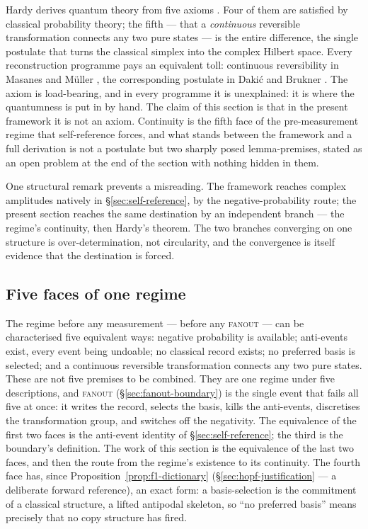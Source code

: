Hardy derives quantum theory from five axioms \autocite{Hardy2001a}. Four of them are satisfied by
classical probability theory; the fifth --- that a \emph{continuous} reversible transformation
connects any two pure states --- is the entire difference, the single postulate that turns the
classical simplex into the complex Hilbert space. Every reconstruction programme pays an equivalent
toll: continuous reversibility in Masanes and M\"{u}ller \autocite{muller_p_2011}, the corresponding
postulate in Daki\'{c} and Brukner \autocite{Brukner2009}. The axiom is load-bearing, and in every
programme it is unexplained: it is where the quantumness is put in by hand. The claim of this
section is that in the present framework it is not an axiom. Continuity is the fifth face of the
pre-measurement regime that self-reference forces, and what stands between the framework and a full
derivation is not a postulate but two sharply posed lemma-premises, stated as an open problem at the
end of the section with nothing hidden in them.

One structural remark prevents a misreading. The framework reaches complex amplitudes natively in
\S\ref{sec:self-reference}, by the negative-probability route; the present section reaches the same
destination by an independent branch --- the regime's continuity, then Hardy's theorem. The two
branches converging on one structure is over-determination, not circularity, and the convergence is
itself evidence that the destination is forced.

\subsection{Five faces of one regime}

The regime before any measurement --- before any \textsc{fanout} --- can be characterised five
equivalent ways: negative probability is available; anti-events exist, every event being undoable;
no classical record exists; no preferred basis is selected; and a continuous reversible
transformation connects any two pure states. These are not five premises to be combined. They are
one regime under five descriptions, and \textsc{fanout} (\S\ref{sec:fanout-boundary}) is the single
event that fails all five at once: it writes the record, selects the basis, kills the anti-events,
discretises the transformation group, and switches off the negativity. The equivalence of the first
two faces is the anti-event identity of \S\ref{sec:self-reference}; the third is the boundary's
definition. The work of this section is the equivalence of the last two faces, and then the route
from the regime's existence to its continuity. The fourth face has, since
Proposition~\ref{prop:f1-dictionary} (\S\ref{sec:hopf-justification} --- a deliberate forward
reference), an exact form: a basis-selection is the commitment of a classical structure, a lifted
antipodal skeleton, so ``no preferred basis'' means precisely that no copy structure has fired.

